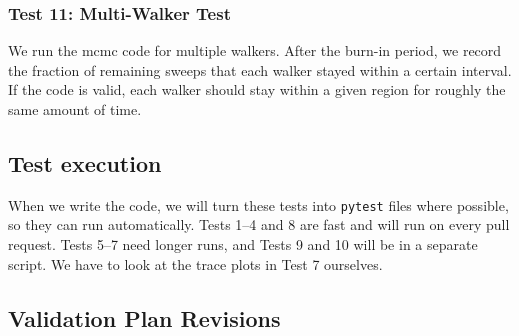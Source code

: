 \documentclass[11pt]{article}
\begin{document}
\subsubsection*{Test 11: Multi-Walker Test}
We run the mcmc code for multiple walkers. After the burn-in period, we record the fraction of remaining sweeps that each walker stayed within a certain interval. If the code is valid, each walker should stay within a given region for roughly the same amount of time. 


\subsection{Test execution}
When we write the code, we will turn these tests into \texttt{pytest} files where possible, so they can run automatically. Tests 1--4 and 8 are fast and will run on every pull request. Tests 5--7 need longer runs, and Tests 9 and 10 will be in a separate script. We have to look at the trace plots in Test 7 ourselves.


\subsection{Validation Plan Revisions}
\end{document}
